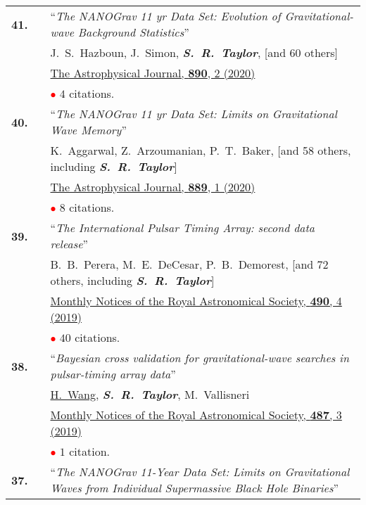 \documentclass[11pt,letterpaper,sans]{moderncv}
\begin{document}
{\begin{longtable}{rp{0.3cm}p{15.8cm}}
\textbf{41.} & & ``\textit{The NANOGrav 11 yr Data Set: Evolution of Gravitational-wave Background Statistics}'' \\ 
&&J.~S.~Hazboun, J.~Simon, \textit{\textbf{S.~R.~Taylor}}, [and 60 others] \\
&& \href{https://ui.adsabs.harvard.edu/link_gateway/2020ApJ...890..108H/PUB_HTML}{{\color{color1} The Astrophysical Journal, \textbf{890}, 2 (2020)}} \\
&& \textcolor{red}{$\bullet$} $4$ citations. \vspace{0.09cm}\\
\textbf{40.} & & ``\textit{The NANOGrav 11 yr Data Set: Limits on Gravitational Wave Memory}'' \\ 
&&K.~Aggarwal, Z.~Arzoumanian, P.~T.~Baker, [and 58 others, including \textit{\textbf{S.~R.~Taylor}}] \\
&& \href{https://iopscience.iop.org/article/10.3847/1538-4357/ab6083}{{\color{color1} The Astrophysical Journal, \textbf{889}, 1 (2020)}} \\
&& \textcolor{red}{$\bullet$} $8$ citations. \vspace{0.09cm}\\
\textbf{39.} & & ``\textit{The International Pulsar Timing Array: second data release}'' \\ 
&&B.~B.~Perera, M.~E.~DeCesar, P.~B.~Demorest, [and 72 others, including \textit{\textbf{S.~R.~Taylor}}] \\
&& \href{https://academic.oup.com/mnras/article-abstract/490/4/4666/5586597?redirectedFrom=fulltext}{{\color{color1} Monthly Notices of the Royal Astronomical Society, \textbf{490}, 4 (2019)}} \\
&& \textcolor{red}{$\bullet$} $40$ citations. \vspace{0.09cm}\\
\textbf{38.} & & ``\textit{Bayesian cross validation for gravitational-wave searches in pulsar-timing array data}'' \\ 
&&\underline{H.~Wang}, \textit{\textbf{S.~R.~Taylor}}, M.~Vallisneri \\
&& \href{https://academic.oup.com/mnras/article/487/3/3644/5511287}{{\color{color1} Monthly Notices of the Royal Astronomical Society, \textbf{487}, 3 (2019)}} \\
&& \textcolor{red}{$\bullet$} $1$ citation. \vspace{0.09cm}\\
\textbf{37.} & & ``\textit{The NANOGrav 11-Year Data Set: Limits on Gravitational Waves from Individual Supermassive Black Hole Binaries}'' \\ 

\end{longtable}}
\end{document}

